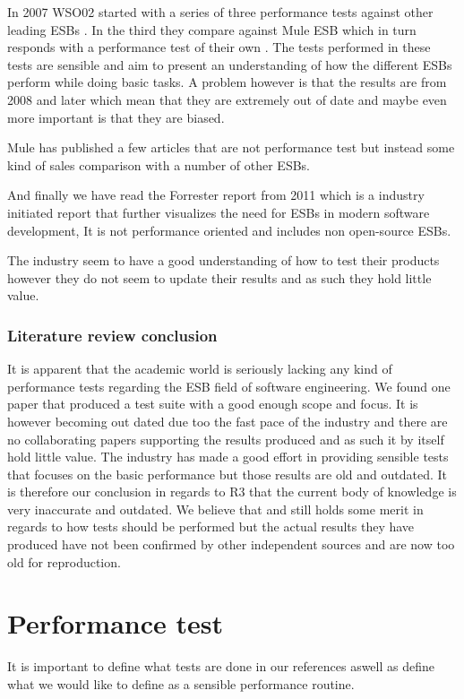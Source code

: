 \documentclass{llncs}
\begin{document}
In 2007 WSO02 started with a series of three performance tests against other leading ESBs \cite{Perera07,Perera07R2,Perera07R3}. In the third they compare against Mule ESB which in turn responds with a performance test of their own \cite{mulesoft08}. The tests performed in these tests are sensible and aim to present an understanding of how the different ESBs perform while doing basic tasks. A problem however is that the results are from 2008 and later which mean that they are extremely out of date and maybe even more important is that they are biased.


Mule has published a few articles that are not performance test but instead some kind of sales comparison with a number of other ESBs\cite{mulevsjboss,mulevsglassfish,mulevsservicemix}.

And finally we have read the Forrester report \cite{forrester11} from 2011 which is a industry initiated report that further visualizes the need for ESBs in modern software development, It is not performance oriented and includes non open-source ESBs.

The industry seem to have a good understanding of how to test their products however they do not seem to update their results and as such they hold little value.

\subsubsection{Literature review conclusion}

It is apparent that the academic world is seriously lacking any kind of performance tests regarding the ESB field of software engineering. We found one paper\cite{Sanjay11} that produced a test suite with a good enough scope and focus. It is however becoming out dated due too the fast pace of the industry and there are no collaborating papers supporting the results produced and as such it by itself hold little value. The industry has made a good effort in providing sensible tests that focuses on the basic performance but those results are old and outdated. 
It is therefore our conclusion in regards to R3 that the current body of knowledge is very inaccurate and outdated. We believe that \cite{Sanjay11} and \cite{Perera07,Perera07R2,Perera07R3,mulesoft08}still holds some merit in regards to how tests should be performed but the actual results they have produced have not been confirmed by other independent sources and are now too old for reproduction.

\section{Performance test}
It is important to define what tests are done in our references aswell as define what we would like to define as a sensible performance routine.
\end{document}
